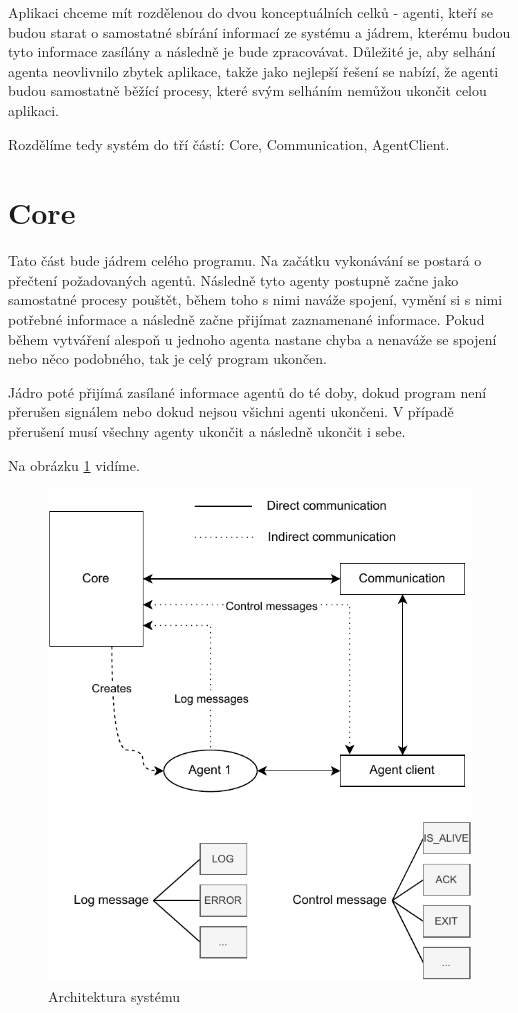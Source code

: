 Aplikaci chceme mít rozdělenou do dvou konceptuálních celků - agenti, kteří se budou starat o samostatné sbírání informací ze systému a jádrem, kterému budou tyto informace zasílány a následně je bude zpracovávat. Důležité je, aby selhání agenta neovlivnilo zbytek aplikace, takže jako nejlepší řešení se nabízí, že agenti budou samostatně běžící procesy, které svým selháním nemůžou ukončit celou aplikaci. 

Rozdělíme tedy systém do tří částí: Core, Communication, AgentClient.
\section*{Core}
Tato část bude jádrem celého programu. Na začátku vykonávání se postará o přečtení požadovaných agentů. Následně tyto agenty postupně začne jako samostatné procesy pouštět, během toho s nimi naváže spojení, vymění si s nimi potřebné informace a následně začne přijímat zaznamenané informace. Pokud během vytváření alespoň u jednoho agenta nastane chyba a nenaváže se spojení nebo něco podobného, tak je celý program ukončen. 

Jádro poté přijímá zasílané informace agentů do té doby, dokud program není přerušen signálem nebo dokud nejsou všichni agenti ukončeni. V případě přerušení musí všechny agenty ukončit a následně ukončit i sebe.

Na obrázku \ref{systemArchitecture} vidíme.

\begin{figure}[hbt]
	\centering
	\includegraphics[width=\textwidth]{diagrams/architecture/architecture_diagram.pdf}
	\caption{Architektura systému}
    \label{systemArchitecture}
\end{figure}

